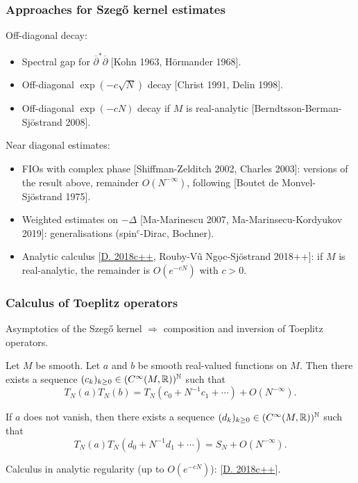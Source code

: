\documentclass[mathserif]{beamer}
\newcommand{\mycite}[1]{{\color{mygreen} \small #1}}
\begin{document}
\begin{frame}
  \frametitle{Approaches for Szeg\H{o} kernel estimates}
  Off-diagonal decay:
  \begin{itemize}
  \item Spectral gap for $\overline{\partial}^*\overline{\partial}$
    \mycite{[Kohn 1963, Hörmander 1968]}.
  \item Off-diagonal $\exp(-c\sqrt{N})$ decay \mycite{[Christ 1991,
      Delin 1998]}.
  \item Off-diagonal $\exp(-cN)$ decay if $M$ is {\color{myorange} real-analytic}
    \mycite{[Berndtsson-Berman-Sjöstrand 2008]}.
  \end{itemize}

  Near diagonal estimates:
  \begin{itemize}
    \item FIOs with complex phase \mycite{[Shiffman-Zelditch 2002,
        Charles 2003]}: versions of
      the result above, remainder $O(N^{-\infty})$, following
      \mycite{[Boutet de Monvel-Sjöstrand 1975]}.
    \item Weighted estimates on $-\Delta$
      \mycite{[Ma-Marinescu 2007, Ma-Marinsecu-Kordyukov 2019]}:
      generalisations (spin$^c$-Dirac, Bochner).
    \item Analytic calculus \mycite{[\underline{D. 2018c++},
        Rouby-Vũ Ng\d{o}c-Sjöstrand 2018++]}: if $M$ is
      {\color{myorange} real-analytic},
      the remainder is $O(e^{-cN})$ with $c>0$.
    \end{itemize}
  \end{frame}

  \begin{frame}
    \frametitle{Calculus of Toeplitz operators}
    Asymptotics of the Szeg\H{o} kernel $\Rightarrow$ composition and
    inversion of Toeplitz operators.

    \begin{theorem}[{\mycite{[Schlichenmaier 2000]}}]Let $M$ be smooth. Let $a$ and $b$ be
      smooth real-valued functions on $M$. Then there exists a sequence $(c_k)_{k\geq
        0}\in (C^{\infty}(M,\mathbb{R}))^{\mathbb{N}}$ such that
      \[
        T_N(a)T_N(b)=T_N(c_0+N^{-1}c_1+\cdots)+O(N^{-\infty}).
        \]

        If $a$ does not vanish, then there exists a sequence
        $(d_k)_{k\geq 0}\in (C^{\infty}(M,\mathbb{R}))^{\mathbb{N}}$ such that
        \[
          T_N(a)T_N(d_0+N^{-1}d_1+\cdots)=S_N+O(N^{-\infty}).
          \]
        \end{theorem}
        Calculus in analytic regularity (up to $O(e^{-cN})$):
        \mycite{[\underline{D. 2018c++}]}.
  \end{frame}
\end{document}
